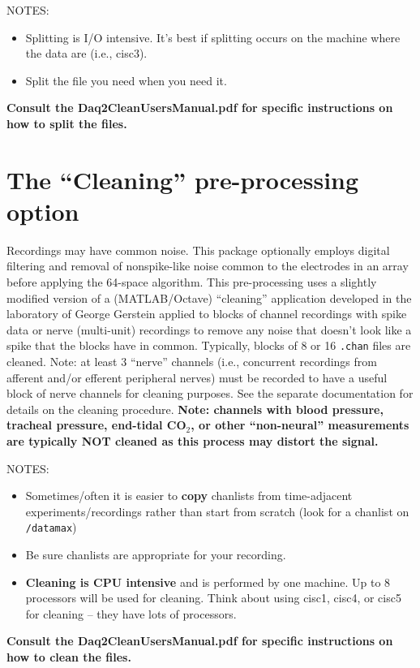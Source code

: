 \documentclass[12pt]{article}
\begin{document}
NOTES:
\begin{itemize}
\item Splitting is I/O intensive. It's best if splitting occurs on the
  machine where the data are (i.e., cisc3).
\item Split the file you need when you need it.
\end{itemize}

{\bfseries Consult the {\ttfamily Daq2CleanUsersManual.pdf} for specific
  instructions on how to split the files.}

\section {The ``Cleaning'' pre-processing option}

Recordings may have common noise. This package optionally employs
digital filtering and removal of nonspike-like noise common to the
electrodes in an array before applying the 64-space algorithm. This
pre-processing uses a slightly modified version of a (MATLAB/Octave)
``cleaning'' application developed in the laboratory of George
Gerstein \citep{musial2002signal} applied to blocks of channel
recordings with spike data or nerve (multi-unit) recordings to remove
any noise that doesn't look like a spike that the blocks have in
common. Typically, blocks of 8 or 16 {\tt *.chan} files are
cleaned. Note: at least 3 ``nerve'' channels (i.e., concurrent
recordings from afferent and/or efferent peripheral nerves) must be
recorded to have a useful block of nerve channels for cleaning
purposes. See the separate documentation for details on the cleaning
procedure.\textbf{ Note: channels with blood pressure, tracheal
  pressure, end-tidal CO$_2$}\textbf{, or other ``non-neural''
  measurements are typically NOT cleaned as this process may distort
  the signal.}

NOTES:
\begin{itemize}
\item Sometimes/often it is easier to \textbf{copy} chanlists from
  time-adjacent experiments/recordings rather than start from scratch
  (look for a chanlist on {\tt /datamax})
\item Be sure chanlists are appropriate for your recording.
\item \textbf{Cleaning is CPU intensive} and is performed by one
  machine. Up to 8 processors will be used for cleaning. Think about
  using cisc1, cisc4, or cisc5 for cleaning -- they have lots of
  processors.
\end{itemize}
{\bfseries Consult the {\ttfamily Daq2CleanUsersManual.pdf} for
  specific instructions on how to clean the files.}
\end{document}
